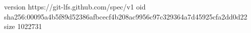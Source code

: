 version https://git-lfs.github.com/spec/v1
oid sha256:00095a4b5f89d52386afbcecf4b208ac9956c97c329364a7d45925cfa2dd0d22
size 1022731
